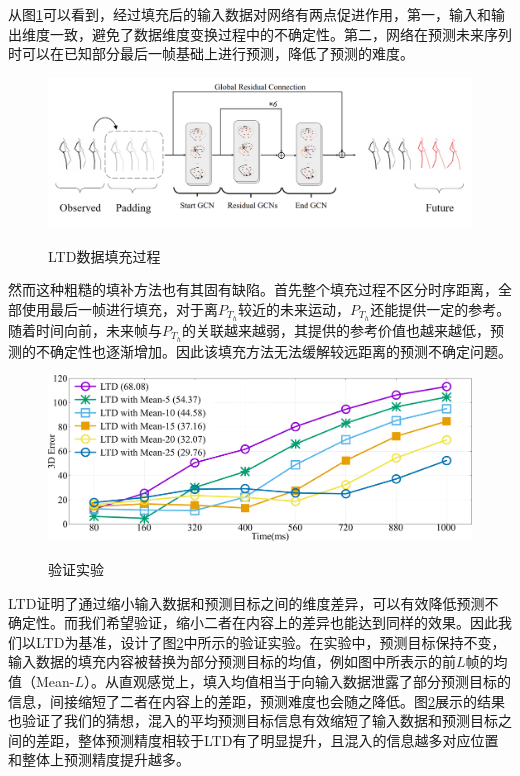 从图\ref{fig:LTD_padding}可以看到，经过填充后的输入数据对网络有两点促进作用，第一，输入和输出维度一致，避免了数据维度变换过程中的不确定性。第二，网络在预测未来序列时可以在已知部分最后一帧基础上进行预测，降低了预测的难度。
\begin{figure}[ht]
    \centering
    \includegraphics[width=1\textwidth]{FigMa/LTD_padding.png}\\
    \vspace{-0.3cm}
    \caption{LTD数据填充过程}
    \label{fig:LTD_padding}
\end{figure}
然而这种粗糙的填补方法也有其固有缺陷。首先整个填充过程不区分时序距离，全部使用最后一帧进行填充，对于离$P_{T_h}$较近的未来运动，$P_{T_h}$还能提供一定的参考。随着时间向前，未来帧与$P_{T_h}$的关联越来越弱，其提供的参考价值也越来越低，预测的不确定性也逐渐增加。因此该填充方法无法缓解较远距离的预测不确定问题。

\begin{figure}[h]
    \centering
    \includegraphics[width=1\textwidth]{FigMa/padding.pdf}\\
    \vspace{-0.3cm}
    \caption{验证实验}
    \label{fig:toy_experiment}
\end{figure}
LTD证明了通过缩小输入数据和预测目标之间的维度差异，可以有效降低预测不确定性。而我们希望验证，缩小二者在内容上的差异也能达到同样的效果。因此我们以LTD为基准，设计了图\ref{fig:toy_experiment}中所示的验证实验。在实验中，预测目标保持不变，输入数据的填充内容被替换为部分预测目标的均值，例如图中所表示的前$L$帧的均值（Mean-$L$）。从直观感觉上，填入均值相当于向输入数据泄露了部分预测目标的信息，间接缩短了二者在内容上的差距，预测难度也会随之降低。图\ref{fig:toy_experiment}展示的结果也验证了我们的猜想，混入的平均预测目标信息有效缩短了输入数据和预测目标之间的差距，整体预测精度相较于LTD有了明显提升，且混入的信息越多对应位置和整体上预测精度提升越多。

